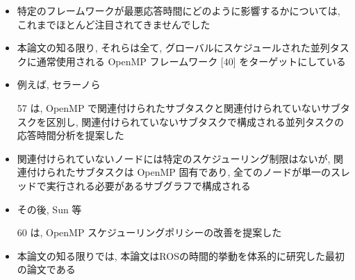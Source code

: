 \begin{frame}{}
    \begin{itemize}
        \item 特定のフレームワークが最悪応答時間にどのように影響するかについては, これまでほとんど注目されてきませんでした
\item 本論文の知る限り, それらは全て, グローバルにスケジュールされた並列タスクに通常使用される OpenMP フレームワーク [40] をターゲットにしている
\item 例えば, セラーノら
\item [57] は, OpenMP で関連付けられたサブタスクと関連付けられていないサブタスクを区別し, 関連付けられていないサブタスクで構成される並列タスクの応答時間分析を提案した
\item 関連付けられていないノードには特定のスケジューリング制限はないが, 関連付けられたサブタスクは OpenMP 固有であり, 全てのノードが単一のスレッドで実行される必要があるサブグラフで構成される
\item その後, Sun 等
\item [60] は, OpenMP スケジューリングポリシーの改善を提案した
\item 本論文の知る限りでは, 本論文はROSの時間的挙動を体系的に研究した最初の論文である
    \end{itemize}
\end{frame}
